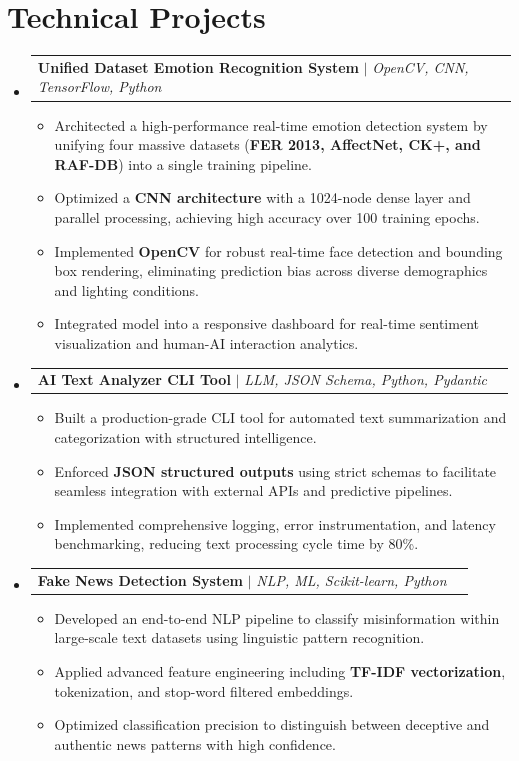 \documentclass[letterpaper,11pt]{article}
\makeatletter
\newcommand{\resumeItem}[1]{
  \item\small{
    {#1 \vspace{-2pt}}
  }
}
\newcommand{\resumeProjectHeading}[2]{
    \item
    \begin{tabular*}{0.97\textwidth}{l@{\extracolsep{\fill}}r}
      \small#1 & #2 \\
    \end{tabular*}\vspace{-7pt}
}
\newcommand{\resumeSubHeadingListStart}{\begin{itemize}[leftmargin=0.15in, label={}]}
\newcommand{\resumeSubHeadingListEnd}{\end{itemize}}
\newcommand{\resumeItemListStart}{\begin{itemize}}
\newcommand{\resumeItemListEnd}{\end{itemize}\vspace{-5pt}}
\makeatother
\begin{document}
\section{Technical Projects}
    \resumeSubHeadingListStart
      \resumeProjectHeading
          {\textbf{Unified Dataset Emotion Recognition System} $|$ \emph{OpenCV, CNN, TensorFlow, Python}}{}
          \resumeItemListStart
            \resumeItem{Architected a high-performance real-time emotion detection system by unifying four massive datasets (\textbf{FER 2013, AffectNet, CK+, and RAF-DB}) into a single training pipeline.}
            \resumeItem{Optimized a \textbf{CNN architecture} with a 1024-node dense layer and parallel processing, achieving high accuracy over 100 training epochs.}
            \resumeItem{Implemented \textbf{OpenCV} for robust real-time face detection and bounding box rendering, eliminating prediction bias across diverse demographics and lighting conditions.}
            \resumeItem{Integrated model into a responsive dashboard for real-time sentiment visualization and human-AI interaction analytics.}
          \resumeItemListEnd

      \resumeProjectHeading
          {\textbf{AI Text Analyzer CLI Tool} $|$ \emph{LLM, JSON Schema, Python, Pydantic}}{}
          \resumeItemListStart
            \resumeItem{Built a production-grade CLI tool for automated text summarization and categorization with structured intelligence.}
            \resumeItem{Enforced \textbf{JSON structured outputs} using strict schemas to facilitate seamless integration with external APIs and predictive pipelines.}
            \resumeItem{Implemented comprehensive logging, error instrumentation, and latency benchmarking, reducing text processing cycle time by 80\%.}
          \resumeItemListEnd

      \resumeProjectHeading
          {\textbf{Fake News Detection System} $|$ \emph{NLP, ML, Scikit-learn, Python}}{}
          \resumeItemListStart
            \resumeItem{Developed an end-to-end NLP pipeline to classify misinformation within large-scale text datasets using linguistic pattern recognition.}
            \resumeItem{Applied advanced feature engineering including \textbf{TF-IDF vectorization}, tokenization, and stop-word filtered embeddings.}
            \resumeItem{Optimized classification precision to distinguish between deceptive and authentic news patterns with high confidence.}
          \resumeItemListEnd
    \resumeSubHeadingListEnd


\end{document}
